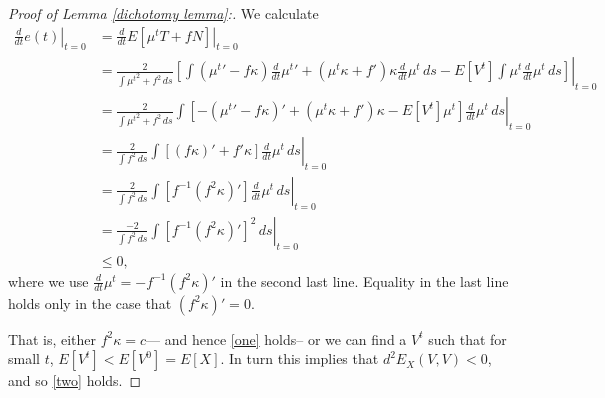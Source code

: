 \begin{proof}[Proof of Lemma \ref{dichotomy lemma}:]
We  calculate
\begin{align*}
\left.\frac{d}{dt}e(t)\right|_{t=0}&= \left.\frac{d}{dt}E[\mu^t T+ fN]  \right|_{t=0} \\
 &= \left.
\frac{2}{\int {{\mu^t}}^2 + f^2 \,ds }\left[
{\int ({\mu^t}'-f\kappa)\frac{d}{dt}{\mu^t}'   + ({\mu^t}\kappa+ f')\kappa \frac{d}{dt}{\mu^t}  \,ds }- E[V^t]{\int {\mu^t} \frac{d}{dt}{\mu^t} \,ds }\right]
 \right|_{t=0}  \\
 &= \left.
\frac{2}{\int {{\mu^t}}^2 + f^2 \,ds }
\int \left[   -({\mu^t}'-f\kappa)'  + ({\mu^t}\kappa+ f')\kappa - E[V^t] {\mu^t}  
\right]
\frac{d}{dt}{\mu^t}  
\,ds   \right|_{t=0} 
\\
&= \left.
\frac{2}{\int  f^2 \,ds }
\int \left[   (f\kappa)'  +  f'\kappa  
\right]
\frac{d}{dt}{\mu^t}  
\,ds   \right|_{t=0}
\\
&= \left.
\frac{2}{\int  f^2 \,ds }
\int \left[  f^{-1} (f^2\kappa)'  
\right]
\frac{d}{dt}{\mu^t}  
\,ds   \right|_{t=0}
\\
&= \left.
\frac{-2}{\int  f^2 \,ds }
\int \left[  f^{-1} (f^2\kappa)'  
\right]^2
\,ds   \right|_{t=0}
 \\&\le 0,
\end{align*}
where we use $\frac{d}{dt}{\mu^t}=-{f}^{-1}(f^2\kappa)'$ in the second last line.   Equality in the last line holds only in the case that $(f^2\kappa)'=0$.

That is, either $f^2\kappa=c$--- and hence \ref{one} holds-- or we can find a $V^t$ such that for small $t$, $E[V^t]<E[V^0]=E[X]$.   In turn this implies that $d^2E_X(V,V)<0$, and so \ref{two} holds.      

\end{proof}